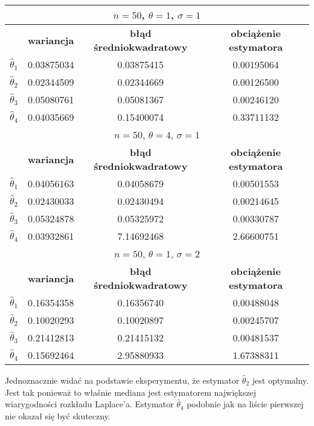 \documentclass[a4paper]{article}
\begin{document}
\begin{table}[H]
\centering
\begin{tabular}{|c|c|c|c|}
\hline
\multicolumn{4}{|c|}{$n=50$, $\theta=1$, $\sigma=1$} \\ \hline
                  & \textbf{wariancja}   & \textbf{błąd średniokwadratowy} & \textbf{obciążenie estymatora} \\ \hline
$\hat{\theta}_1$ & 0.03875034 & 0.03875415 & 0.00195064 \\ \hline
$\hat{\theta}_2$ & 0.02344509 & 0.02344669 & 0.00126500 \\ \hline
$\hat{\theta}_3$ & 0.05080761 & 0.05081367 & 0.00246120 \\ \hline
$\hat{\theta}_4$ & 0.04035669 & 0.15400074 & 0.33711132 \\ \hline
\multicolumn{4}{|c|}{$n=50$, $\theta=4$, $\sigma=1$} \\ \hline
                  & \textbf{wariancja}   & \textbf{błąd średniokwadratowy} & \textbf{obciążenie estymatora} \\ \hline
$\hat{\theta}_1$ & 0.04056163 & 0.04058679 & 0.00501553 \\ \hline
$\hat{\theta}_2$ & 0.02430033 & 0.02430494 & 0.00214645 \\ \hline
$\hat{\theta}_3$ & 0.05324878 & 0.05325972 & 0.00330787 \\ \hline
$\hat{\theta}_4$ & 0.03932861 & 7.14692468 & 2.66600751 \\ \hline
\multicolumn{4}{|c|}{$n=50$, $\theta=1$, $\sigma=2$} \\ \hline
                  & \textbf{wariancja}   & \textbf{błąd średniokwadratowy} & \textbf{obciążenie estymatora} \\ \hline
$\hat{\theta}_1$ & 0.16354358 & 0.16356740 & 0.00488048 \\ \hline
$\hat{\theta}_2$ & 0.10020293 & 0.10020897 & 0.00245707 \\ \hline
$\hat{\theta}_3$ & 0.21412813 & 0.21415132 & 0.00481537 \\ \hline
$\hat{\theta}_4$ & 0.15692464 & 2.95880933 & 1.67388311 \\ \hline
\end{tabular}
\end{table}

Jednoznacznie widać na podstawie eksperymentu, że estymator $\hat{\theta}_2$ jest optymalny. Jest tak ponieważ to właśnie mediana jest estymatorem największej wiarygodności rozkładu Laplace'a. Estymator $\hat{\theta}_4$ podobnie jak na liście pierwszej nie okazał się być skuteczny.
\newline
\end{document}
